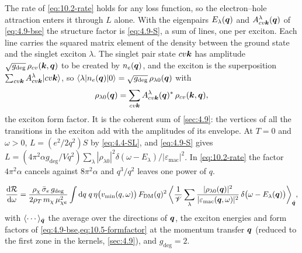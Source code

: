 The rate of \cref{eq:10.2-rate} holds for any loss function, so the electron--hole attraction enters it through $L$ alone. With the eigenpairs $E_\lambda(\bm{q})$ and $A^\lambda_{cv\bm{k}}(\bm{q})$ of \cref{eq:4.9-bse} the structure factor is \cref{eq:4.9-S}, a sum of lines, one per exciton. Each line carries the squared matrix element of the density between the ground state and the singlet exciton $\lambda$. The singlet pair state $cv\bm{k}$ has amplitude $\sqrt{g_{\mathrm{deg}}}\,\rho_{cv}(\bm{k},\bm{q})$ to be created by $n_e(\bm{q})$, and the exciton is the superposition $\sum_{cv\bm{k}}A^\lambda_{cv\bm{k}}|cv\bm{k}\rangle$, so $\langle\lambda|n_e(\bm{q})|0\rangle = \sqrt{g_{\mathrm{deg}}}\,\rho_{\lambda0}(\bm{q})$ with
\begin{equation}
  \rho_{\lambda0}(\bm{q}) = \sum_{cv\bm{k}}A^\lambda_{cv\bm{k}}(\bm{q})^*\,\rho_{cv}(\bm{k},\bm{q}) ,
  \label{eq:10.5-formfactor}
\end{equation}
the exciton form factor. It is the coherent sum of \cref{sec:4.9}: the vertices of all the transitions in the exciton add with the amplitudes of its envelope. At $T = 0$ and $\omega > 0$, $L = (e^2/2q^2)S$ by \cref{eq:4.4-SL}, and \cref{eq:4.9-S} gives $L = (4\pi^2\alpha g_{\mathrm{deg}}/Vq^2)\sum_\lambda|\rho_{\lambda0}|^2\delta(\omega - E_\lambda)/|\varepsilon_{\mathrm{mac}}|^2$. In \cref{eq:10.2-rate} the factor $4\pi^2\alpha$ cancels against $8\pi^2\alpha$ and $q^3/q^2$ leaves one power of $q$.
\begin{keyresult}
\begin{equation}
  \frac{\mathrm{d}\mathcal{R}}{\mathrm{d}\omega} = \frac{\rho_\chi\,\bar{\sigma}_{e}\,g_{\mathrm{deg}}}{2\rho_T\,m_{\chi}\,\mu_{\chi e}^2}\int\mathrm{d} q\;q\,\eta\bigl(v_{\mathrm{min}}(q,\omega)\bigr)\,F_{\mathrm{DM}}(q)^2\,\biggl\langle\frac1{\mathscr{V}}\sum_\lambda\frac{|\rho_{\lambda0}(\bm{q})|^2}{|\varepsilon_{\mathrm{mac}}(\bm{q},\omega)|^2}\,\delta\bigl(\omega - E_\lambda(\bm{q})\bigr)\biggr\rangle_{\hat{\bm{q}}} ,
  \label{eq:10.5-rate}
\end{equation}
with $\langle\cdots\rangle_{\hat{\bm{q}}}$ the average over the directions of $\bm{q}$, the exciton energies and form factors of \cref{eq:4.9-bse,eq:10.5-formfactor} at the momentum transfer $\bm{q}$ (reduced to the first zone in the kernels, \cref{sec:4.9}), and $g_{\mathrm{deg}} = 2$.
\end{keyresult}

